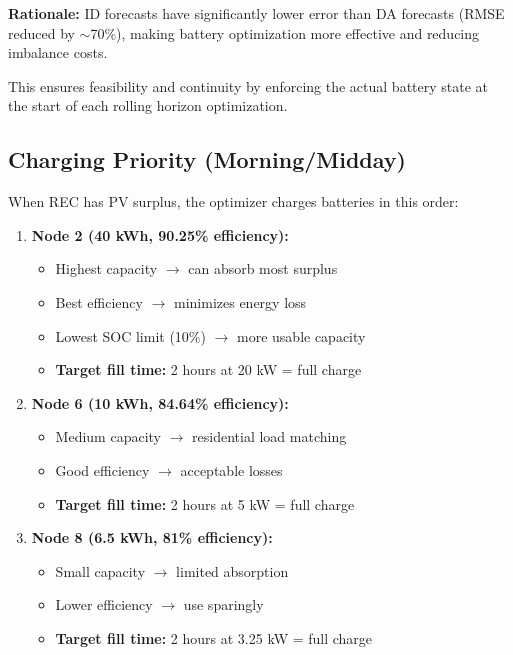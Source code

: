 \documentclass[11pt,a4paper]{article}
\begin{document}
\textbf{Rationale:} ID forecasts have significantly lower error than DA forecasts (RMSE reduced by $\sim$70\%), making battery optimization more effective and reducing imbalance costs.

This ensures feasibility and continuity by enforcing the actual battery state at the start of each rolling horizon optimization.

\subsection{Charging Priority (Morning/Midday)}

When REC has PV surplus, the optimizer charges batteries in this order:

\begin{enumerate}
    \item \textbf{Node 2 (40 kWh, 90.25\% efficiency):}
        \begin{itemize}
            \item Highest capacity $\rightarrow$ can absorb most surplus
            \item Best efficiency $\rightarrow$ minimizes energy loss
            \item Lowest SOC limit (10\%) $\rightarrow$ more usable capacity
            \item \textbf{Target fill time:} 2 hours at 20 kW = full charge
        \end{itemize}
    
    \item \textbf{Node 6 (10 kWh, 84.64\% efficiency):}
        \begin{itemize}
            \item Medium capacity $\rightarrow$ residential load matching
            \item Good efficiency $\rightarrow$ acceptable losses
            \item \textbf{Target fill time:} 2 hours at 5 kW = full charge
        \end{itemize}
    
    \item \textbf{Node 8 (6.5 kWh, 81\% efficiency):}
        \begin{itemize}
            \item Small capacity $\rightarrow$ limited absorption
            \item Lower efficiency $\rightarrow$ use sparingly
            \item \textbf{Target fill time:} 2 hours at 3.25 kW = full charge
        \end{itemize}
\end{enumerate}
\end{document}
